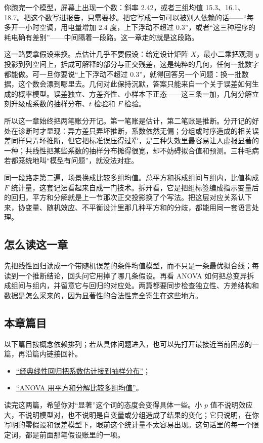 你跑完一个模型，屏幕上出现一个数：斜率 2.42，或者三组均值 15.3、16.1、18.7。把这个数写进报告，只需要抄。把它写成一句可以被别人依赖的话——``每多开一小时空调，用电量增加 2.4 度，上下浮动不超过 0.3''，或者``这三种程序的耗电确有差别''——中间隔着一段路。这一章走的就是这段路。

这一路要拿假设来换。点估计几乎不要假设：给定设计矩阵 \(X\)，最小二乘把观测 \(y\) 投影到列空间上，拆成可解释的部分与正交残差，这是纯粹的几何，任何一批数字都能做。可一旦你要说``上下浮动不超过 0.3''，就得回答另一个问题：换一批数据，这个数会漂到哪里去。几何对此保持沉默，答案只能来自一个关于误差如何生成的概率模型。误差独立、方差齐性、小样本下正态——这三条一加，几何分解立刻升级成系数的抽样分布、\(t\) 检验和 \(F\) 检验。

所以这一章始终把两笔账分开记。第一笔账是估计，第二笔账是推断。分开记的好处在诊断时才显现：异方差只弄坏推断，系数依然无偏；分组或时序造成的相关误差同样只弄坏推断，但它把标准误压得过窄，是三种失效里最容易让人虚报显著的一种；共线性把某些系数的抽样分布摊得很宽，却不妨碍拟合值和预测。三种毛病若都笼统地叫``模型有问题''，就没法对症。

同一段路走第二遍，场景换成比较多组均值。总平方和拆成组间与组内，比值构成 \(F\) 统计量，这套记法看起来自成一门技术。拆开看，它是把组标签编成指示变量后的回归，平方和分解就是上一节那次正交投影换了个写法。把这层对应关系认下来，协变量、随机效应、不平衡设计里那几种平方和的分歧，都能用同一套语言处理。

\subsection{怎么读这一章}

先把线性回归读成一个带随机误差的条件均值模型，而不只是一条最优拟合线；每读到一个推断结论，回头问它用掉了哪几条假设。再看 ANOVA 如何把总变异拆成组间与组内，并留意它与回归的对应处。两篇都要同步检查独立性、方差结构和数据是怎么采来的，因为显著性的合法性完全寄生在这些地方。

\subsection{本章篇目}

以下篇目按概念依赖排列；若从具体问题进入，也可以先打开最接近当前困惑的一篇，再沿篇内链接回补。

\begin{itemize}
\tightlist
\item \hyperref[sec:11-Mathematical-Statistics/08-Regression-and-ANOVA/01]{``经典线性回归把系数估计接到抽样分布''}；
\item \hyperref[sec:11-Mathematical-Statistics/08-Regression-and-ANOVA/02]{``ANOVA 用平方和分解比较多组均值''}。
\end{itemize}

读完这两篇，希望你对``显著''这个词的态度会变得具体一些。小 \(p\) 值不说明效应大，不说明模型对，也不说明是自变量或分组造成了结果的变化；它只说明，在你写明的零假设和误差模型下，眼前这个统计量不太容易出现。这句话里的每一个限定词，都是前面那笔假设账里的一项。
